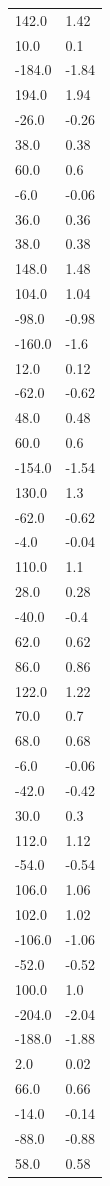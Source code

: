 \begin{longtable}{ll}
142.0 & 1.42 \\
10.0 & 0.1 \\
-184.0 & -1.84 \\
194.0 & 1.94 \\
-26.0 & -0.26 \\
38.0 & 0.38 \\
60.0 & 0.6 \\
-6.0 & -0.06 \\
36.0 & 0.36 \\
38.0 & 0.38 \\
148.0 & 1.48 \\
104.0 & 1.04 \\
-98.0 & -0.98 \\
-160.0 & -1.6 \\
12.0 & 0.12 \\
-62.0 & -0.62 \\
48.0 & 0.48 \\
60.0 & 0.6 \\
-154.0 & -1.54 \\
130.0 & 1.3 \\
-62.0 & -0.62 \\
-4.0 & -0.04 \\
110.0 & 1.1 \\
28.0 & 0.28 \\
-40.0 & -0.4 \\
62.0 & 0.62 \\
86.0 & 0.86 \\
122.0 & 1.22 \\
70.0 & 0.7 \\
68.0 & 0.68 \\
-6.0 & -0.06 \\
-42.0 & -0.42 \\
30.0 & 0.3 \\
112.0 & 1.12 \\
-54.0 & -0.54 \\
106.0 & 1.06 \\
102.0 & 1.02 \\
-106.0 & -1.06 \\
-52.0 & -0.52 \\
100.0 & 1.0 \\
-204.0 & -2.04 \\
-188.0 & -1.88 \\
2.0 & 0.02 \\
66.0 & 0.66 \\
-14.0 & -0.14 \\
-88.0 & -0.88 \\
58.0 & 0.58 \\

\end{longtable}
